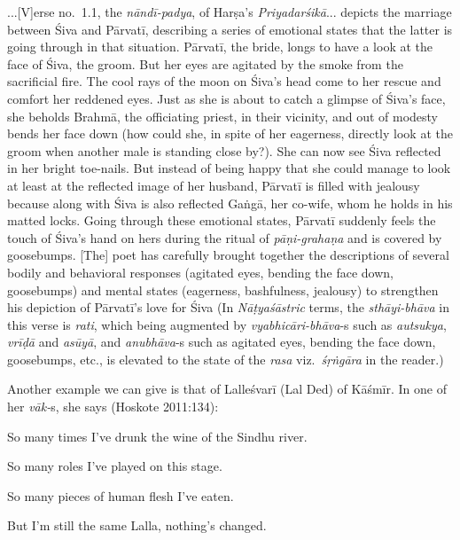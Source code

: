 \begin{myquote}
...[V]erse no.~1.1, the \textsl{nāndī-padya}, of Harṣa’s \textsl{Priyadarśikā}... depicts the marriage between Śiva and Pārvatī, describing a series of emotional states that the latter is going through in that situation. Pārvatī, the bride, longs to have a look at the face of Śiva, the groom. But her eyes are agitated by the smoke from the sacrificial fire. The cool rays of the moon on Śiva’s head come to her rescue and comfort her reddened eyes. Just as she is about to catch a glimpse of Śiva’s face, she beholds Brahmā, the officiating priest, in their vicinity, and out of modesty bends her face down (how could she, in spite of her eagerness, directly look at the groom when another male is standing close by?). She can now see Śiva reflected in her bright toe-nails. But instead of being happy that she could manage to look at least at the reflected image of her husband, Pārvatī is filled with jealousy because along with Śiva is also reflected Gaṅgā, her co-wife, whom he holds in his matted locks. Going through these emotional states, Pārvatī suddenly feels the touch of Śiva’s hand on hers during the ritual of \textsl{pāṇi-grahaṇa} and is covered by goosebumps. [The] poet has carefully brought together the descriptions of several bodily and behavioral responses (agitated eyes, bending the face down, goosebumps) and mental states (eagerness, bashfulness, jealousy) to strengthen his depiction of Pārvatī’s love for Śiva (In \textsl{Nāṭyaśāstric} terms, the \textsl{sthāyi-bhāva} in this verse is \textsl{rati}, which being augmented by \textsl{vyabhicāri-bhāva}-s such as \textsl{autsukya}, \textsl{vrīḍā} and \textsl{asūyā}, and \textsl{anubhāva}-s such as agitated eyes, bending the face down, goosebumps, etc., is elevated to the state of the \textsl{rasa} viz.\ \textsl{śṛṅgāra} in the reader.)
\end{myquote}

Another example we can give is that of Lalleśvarī (Lal Ded) of Kāśmīr. In one of her \textsl{vāk-}s, she says (Hoskote 2011:134):

\begin{myquote}
So many times I’ve drunk the wine of the Sindhu river.

So many roles I’ve played on this stage.

So many pieces of human flesh I’ve eaten.

But I’m still the same Lalla, nothing’s changed.
\end{myquote}

